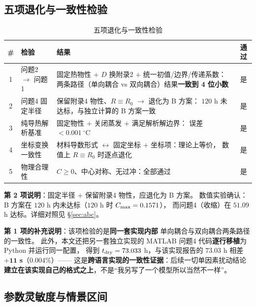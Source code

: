 \subsection{五项退化与一致性检验}
\label{sec:degrade}

\begin{table}[H]
  \centering
  \caption{五项退化与一致性检验}
  \label{tab:degrade}
  \footnotesize
  \begin{tabularx}{\textwidth}{@{}clXc@{}}
    \toprule
    \# & 检验 & 结果 & 通过 \\
    \midrule
    1 & 问题2 $\to$ 问题1
      & 固定热物性 $+$ $D$ 换附录2 $+$ 统一初值/边界/传递系数：
        两条路径（单向耦合 vs 双向耦合）结果\textbf{一致到 4 位小数} & 是 \\
    2 & 问题4 固定半径
      & 保留附录4 物性、$R\equiv R_0$ $\to$ 退化为 B 方案：
        $120$ h 未达标，与独立计算的 B 方案一致 & 是 \\
    3 & 纯导热解析基准 & 固定物性 $+$ 关闭蒸发 $+$ 满足解析解边界：
        误差 $<0.001\ ^\circ$C & 是 \\
    4 & 坐标变换一致性
      & 材料导数形式 $\leftrightarrow$ 固定坐标 $+$ 坐标项：理论上等价，
        数值上 $R\equiv R_0$ 时逐点退化 & 是 \\
    5 & 物理合理性 & $C\ge0$、中心对称、无过冲：全部通过 & 是 \\
    \bottomrule
  \end{tabularx}
\end{table}

\textbf{第 2 项说明}：固定半径 $+$ 保留附录4 物性，应退化为 B 方案。
数值实验确认：B 方案在 $120$ h 内未达标（$120$ h 时 $C_{\max}=0.1571$），
而问题4（收缩）在 $51.09$ h 达标。详细对照见 \S\ref{sec:abc}。

\textbf{第 1 项的补充说明}：该项检验的是\textbf{同一套实现内部}
单向耦合与双向耦合两条路径的一致性。
此外，本文还把另一套独立实现的 MATLAB 问题4 代码\textbf{逐行移植}为 Python 并运行同一配置，
得到 $t_{\mathrm{dry}}=73.033$ h，与该实现报告的 $73.03$ h 相差
$\mathbf{+11}$ \textbf{s}（$0.004\%$）——
这是\textbf{跨语言实现的一致性证据}：后续一切单因素扰动结论
\textbf{建立在该实现自己的格式之上}，不是``我另写了一个模型所以当然不一样''。

\subsection{参数灵敏度与情景区间}


